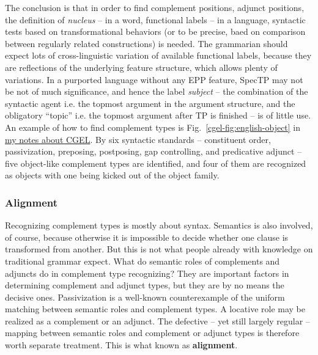 \documentclass{article}
\newcommand*{\citefig}[1]{Fig.~{#1}}
\newcommand*{\concept}[1]{\textbf{#1}}
\newcommand*{\term}[1]{\emph{#1}}
\newcommand{\cgel}{\href{../English/cambridge.pdf}{my notes about CGEL}}
\begin{document}
The conclusion is that in order to find 
complement positions, adjunct positions, the definition of \term{nucleus} 
-- in a word, functional labels -- in a language, 
syntactic tests based on transformational behaviors 
(or to be precise, baed on comparison between regularly related constructions) is needed.
The grammarian should expect lots of cross-linguistic variation of available functional labels,
because they are reflections of the underlying feature structure,
which allows plenty of variations.
In a purported language without any EPP feature, SpecTP may not be not of much significance,
and hence the label \term{subject} 
-- the combination of the syntactic agent i.e. the topmost argument in the argument structure, 
and the obligatory ``topic'' i.e. the topmost argument after TP is finished --
is of little use.
An example of how to find complement types is \citefig{\ref{cgel-fig:english-object}} in \cgel.
By six syntactic standards 
-- constituent order, passivization, preposing, postposing, gap controlling, and predicative adjunct --
five object-like complement types are identified,
and four of them are recognized as objects with one being kicked out of the object family.

\subsubsection{Alignment}\label{sec:alignment}

Recognizing complement types is mostly about syntax.
Semantics is also involved, of course, 
because otherwise it is impossible to decide whether one clause is transformed from another.
But this is not what people already with knowledge on traditional grammar expect.
What do semantic roles of complements and adjuncts 
do in complement type recognizing?
They are important factors in determining complement and adjunct types,
but they are by no means the decisive ones.
Passivization is a well-known counterexample of the uniform matching between semantic roles and complement types.
A locative role may be realized as a complement or an adjunct.
The defective -- yet still largely regular -- mapping between semantic roles and complement or adjunct types 
is therefore worth separate treatment.
This is what known as \concept{alignment}.
\end{document}
